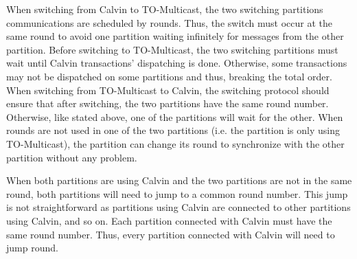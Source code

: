 \documentclass[a4paper, 10pt]{article}
\newcommand{\GE}{TO-Multicast}
\newcommand{\PE}{Calvin}
\newcommand{\Li}[1]{\mynote{Li}{#1}{blue}}
\newcommand{\Ch}[1]{\mynote{Ch}{#1}{green}}
\begin{document}
   When switching from \PE{} to \GE{}, the two switching partitions communications are
   scheduled by rounds. Thus, the switch must occur at the same round to avoid one partition
   waiting infinitely for messages from the other partition. Before switching to \GE{},
   the two switching partitions must wait until \PE{} transactions' dispatching is done.
   Otherwise, some transactions may not be dispatched on some partitions and thus, breaking
   the total order. \\

   When switching from \GE{} to \PE{},
   the switching protocol should ensure that after switching, the two partitions have the same round number.
   Otherwise, like stated above, one of the partitions will wait for the other.
   When rounds are not used in one of the two partitions (i.e. the partition is
   only using \GE{}), the partition can change its round to synchronize with the other
   partition without any problem.

   When both partitions are using \PE{} and the two partitions are not in the
   same round, both partitions will need to jump to a common round number. This
   jump is not straightforward as partitions using \PE{} are connected to
   other partitions using \PE{}, and so on. Each partition connected with \PE{}
   must have the same round number. Thus, every partition connected with \PE{}
   will need to jump round.

\end{document}

